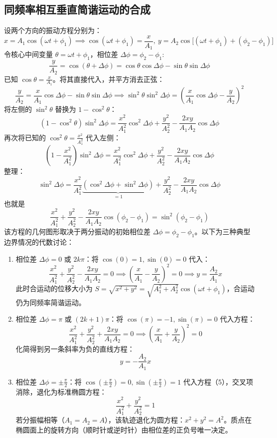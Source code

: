 
\subsection{同频率相互垂直简谐运动的合成}

设两个方向的振动方程分别为：\[x = A_1 \cos(\omega t + \phi_1) \implies \cos(\omega t + \phi_1) = \frac{x}{A_1},~y = A_2 \cos\big[ (\omega t + \phi_1) + (\phi_2 - \phi_1) \big]\]
令核心中间变量 $\theta = \omega t + \phi_1$，相位差 $\Delta \phi = \phi_2 - \phi_1$:
$$\frac{y}{A_2} = \cos(\theta + \Delta \phi)= \cos\theta \cos\Delta \phi - \sin\theta \sin\Delta \phi $$
已知 $\cos\theta = \frac{x}{A_1}$。将其直接代入，并平方消去正弦：
$$\frac{y}{A_2} = \frac{x}{A_1} \cos\Delta \phi - \sin\theta \sin\Delta \phi\implies\sin^2\theta \sin^2\Delta \phi = \left( \frac{x}{A_1} \cos\Delta \phi - \frac{y}{A_2} \right)^2$$
将左侧的 $\sin^2\theta$ 替换为 $1 - \cos^2\theta$：
$$(1 - \cos^2\theta) \sin^2\Delta \phi = \frac{x^2}{A_1^2} \cos^2\Delta \phi + \frac{y^2}{A_2^2} - \frac{2xy}{A_1 A_2} \cos\Delta \phi$$再次将已知的 $\cos^2\theta = \frac{x^2}{A_1^2}$ 代入左侧：$$\left( 1 - \frac{x^2}{A_1^2} \right) \sin^2\Delta \phi = \frac{x^2}{A_1^2} \cos^2\Delta \phi + \frac{y^2}{A_2^2} - \frac{2xy}{A_1 A_2} \cos\Delta \phi$$整理：$$\sin^2\Delta \phi = \frac{x^2}{A_1^2} \underbrace{\left( \cos^2\Delta \phi + \sin^2\Delta \phi \right)}_{=1} + \frac{y^2}{A_2^2} - \frac{2xy}{A_1 A_2} \cos\Delta \phi$$也就是$$\boxed{\frac{x^2}{A_1^2} + \frac{y^2}{A_2^2} - \frac{2xy}{A_1 A_2} \cos(\phi_2 - \phi_1) = \sin^2(\phi_2 - \phi_1)}$$
该方程的几何图形取决于两分振动的初始相位差 $\Delta \phi = \phi_2 - \phi_1$。以下为三种典型边界情况的代数讨论：
\begin{enumerate}
    \item 相位差 $\Delta \phi = 0$ 或 $2k\pi$：将 $\cos(0) = 1, \sin(0) = 0$ 代入：$$\frac{x^2}{A_1^2} + \frac{y^2}{A_2^2} - \frac{2xy}{A_1 A_2} = 0 \implies \left( \frac{x}{A_1} - \frac{y}{A_2} \right)^2 = 0\implies y = \frac{A_2}{A_1} x$$此时合运动的位移大小为 $S = \sqrt{x^2 + y^2} = \sqrt{A_1^2 + A_2^2} \cos(\omega t + \phi_1)$，合运动仍为同频率简谐运动。
    \item 相位差 $\Delta \phi = \pi$ 或 $(2k+1)\pi$：将 $\cos(\pi) = -1, \sin(\pi) = 0$ 代入方程：$$\frac{x^2}{A_1^2} + \frac{y^2}{A_2^2} + \frac{2xy}{A_1 A_2} = 0 \implies \left( \frac{x}{A_1} + \frac{y}{A_2} \right)^2 = 0$$化简得到另一条斜率为负的直线方程：$$y = -\frac{A_2}{A_1} x$$
    \item 相位差 $\Delta \phi = \pm \frac{\pi}{2}$：将 $\cos\left(\pm\frac{\pi}{2}\right) = 0, \sin\left(\pm\frac{\pi}{2}\right) = 1$ 代入方程（5），交叉项消除，退化为标准椭圆方程：$$\frac{x^2}{A_1^2} + \frac{y^2}{A_2^2} = 1$$若分振幅相等（$A_1 = A_2 = A$），该轨迹退化为圆方程：$x^2 + y^2 = A^2$。质点在椭圆面上的旋转方向（顺时针或逆时针）由相位差的正负号唯一决定。
\end{enumerate}

